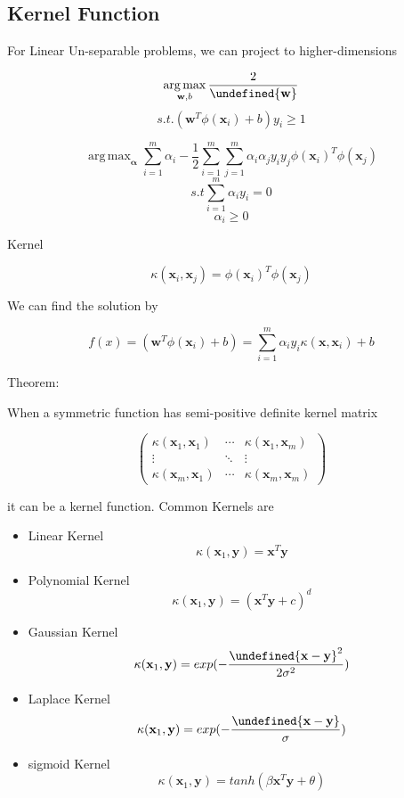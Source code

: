 \documentclass[11pt, openany]{book}              %
\let\norm\undefined %
\DeclarePairedDelimiter\norm{\lVert}{\rVert}
\DeclareMathOperator*{\argmax}{arg\,max}  %
\begin{document}
\subsection{Kernel Function}

For Linear Un-separable problems, we can project to higher-dimensions

$$ \argmax_{\mathbf{w},b} \frac{2}{\norm{\mathbf{w}}}$$
$$s.t. (\mathbf{w}^T\phi(\mathbf{x}_i)+ b)y_i \geq 1$$

$$\argmax_{\boldsymbol{\alpha}}  \sum_{i=1}^m \alpha_i - \frac{1}{2} \sum_{i=1}^m \sum_{j=1}^m \alpha_i \alpha_j y_i y_j \phi(\mathbf{x}_i)^T\phi(\mathbf{x}_j)$$
$$s.t \sum_{i=1}^m \alpha_i y_i = 0$$
$$ \alpha_i \geq 0$$

Kernel

$$\kappa(\mathbf{x}_i, \mathbf{x}_j ) = \phi(\mathbf{x}_i)^T\phi(\mathbf{x}_j)$$

We can find the solution by

$$f(x) = (\mathbf{w}^T\phi(\mathbf{x}_i)+ b) =\sum_{i=1}^m \alpha_i y_i 
\kappa(\mathbf{x}, \mathbf{x}_i ) + b$$

Theorem:

When a symmetric function has semi-positive definite kernel matrix

$$\begin{pmatrix} 
  				\kappa(\mathbf{x}_1, \mathbf{x}_1 )& \cdots & \kappa(\mathbf{x}_1, \mathbf{x}_m )\\ 
  				\vdots & \ddots & \vdots \\
  				\kappa(\mathbf{x}_m, \mathbf{x}_1 )& \cdots & \kappa(\mathbf{x}_m, \mathbf{x}_m )  
\end{pmatrix} $$

 it can be a kernel function. Common Kernels are
 
 \begin{itemize}
	\item Linear Kernel $$\kappa(\mathbf{x}_1, \mathbf{y} ) = \mathbf{x}^T\mathbf{y}$$
	\item Polynomial Kernel $$\kappa(\mathbf{x}_1, \mathbf{y} ) = (\mathbf{x}^T\mathbf{y} + c)^d$$
	\item Gaussian Kernel $$\kappa(\mathbf{x}_1, \mathbf{y} ) = exp(-\frac{\norm{\mathbf{x}-\mathbf{y}}^2}{2\sigma^2})$$
	\item Laplace Kernel $$\kappa(\mathbf{x}_1, \mathbf{y} ) = exp(-\frac{\norm{\mathbf{x}-\mathbf{y}}}{\sigma})$$
	\item sigmoid Kernel $$\kappa(\mathbf{x}_1, \mathbf{y} ) = tanh(\beta \mathbf{x}^T\mathbf{y} + \theta)$$
\end{itemize}
 
\end{document}
